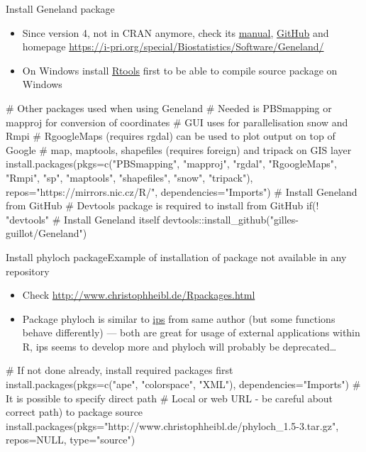 \documentclass[compress, ucs, xelatex, 11pt, xcolor=svgnames, aspectratio=169,
	hyperref={
		bookmarks=true,
		unicode=true,
		colorlinks=true,
		pdftitle={Molecular data in R},
		plainpages=false,
		pdfauthor={Vojtech Zeisek},
		pdfsubject={Course about phylogeny and evolution in R},
		pdfcreator={XeLaTeX},
		pdfkeywords={R, evolution, phylogeny, molecular data},
		linkcolor=Crimson, %
		anchorcolor=Magenta, %
		citecolor=Magenta, %
		filecolor=Magenta, %
		menucolor=Magenta, %
		urlcolor=DodgerBlue, %
		pdftex},
	url={hyphens, lowtilde} %
	]{beamer}
\begin{document}
\begin{frame}[fragile]{Install Geneland package}
	\label{Geneland}
	\begin{itemize}
		\item Since version 4, not in CRAN anymore, check its \href{https://i-pri.org/special/Biostatistics/Software/Geneland/Geneland-Doc.pdf}{manual}, \href{https://github.com/gilles-guillot/Geneland}{GitHub} and homepage \url{https://i-pri.org/special/Biostatistics/Software/Geneland/}
		\item On Windows install \href{https://cran.r-project.org/bin/windows/Rtools/}{Rtools} first to be able to compile source package on Windows
	\end{itemize}
	\begin{spluscode}
    # Other packages used when using Geneland
    # Needed is PBSmapping or mapproj for conversion of coordinates
    # GUI uses for parallelisation snow and Rmpi
    # RgoogleMaps (requires rgdal) can be used to plot output on top of Google
    # map, maptools, shapefiles (requires foreign) and tripack on GIS layer
    install.packages(pkgs=c("PBSmapping", "mapproj", "rgdal", "RgoogleMaps",
      "Rmpi", "sp", "maptools", "shapefiles", "snow", "tripack"),
      repos="https://mirrors.nic.cz/R/", dependencies="Imports")
    # Install Geneland from GitHub
    # Devtools package is required to install from GitHub
    if(! "devtools" %
    # Install Geneland itself
    devtools::install_github("gilles-guillot/Geneland")
	\end{spluscode}
\end{frame}

\begin{frame}[fragile]{Install phyloch package}{Example of installation of package not available in any repository}
	\label{phyloch}
	\begin{itemize}
		\item Check \url{http://www.christophheibl.de/Rpackages.html}
		\item Package phyloch is similar to \href{https://CRAN.R-project.org/package=ips}{ips} from same author (but some functions behave differently) --- both are great for usage of external applications within R, ips seems to develop more and phyloch will probably be deprecated\ldots
	\end{itemize}
	\begin{spluscode}
    # If not done already, install required packages first
    install.packages(pkgs=c("ape", "colorspace", "XML"),
      dependencies="Imports")
    # It is possible to specify direct path
    # Local or web URL - be careful about correct path) to package source
    install.packages(pkgs="http://www.christophheibl.de/phyloch_1.5-3.tar.gz",
      repos=NULL, type="source")
	\end{spluscode}
\end{frame}
\end{document}

